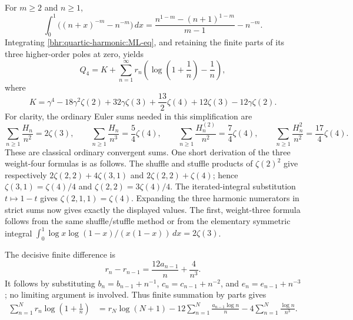 For $m\ge2$ and $n\ge1$,
\[
 \int_0^1\bigl((n+x)^{-m}-n^{-m}\bigr)\,dx
     =\frac{n^{1-m}-(n+1)^{1-m}}{m-1}-n^{-m}.
\]
Integrating \eqref{bhr:quartic-harmonic:ML-eq}, and retaining the finite
parts of its three higher-order poles at zero, yields
\begin{equation}
 Q_4=K+\sum_{n=1}^{\infty}r_n
      \left(\log\left(1+\frac1n\right)-\frac1n\right),
      \label{bhr:quartic-harmonic:K-eq}
\end{equation}
where
\begin{equation}
 K=\gamma^4-18\gamma^2\zeta(2)+32\gamma\zeta(3)
       +\frac{13}{2}\zeta(4)+12\zeta(3)-12\gamma\zeta(2).
       \label{bhr:quartic-harmonic:K}
\end{equation}
For clarity, the ordinary Euler sums needed in this simplification are
\begin{equation}
 \sum_{n\ge1}\frac{H_n}{n^2}=2\zeta(3),\qquad
 \sum_{n\ge1}\frac{H_n}{n^3}=\frac54\zeta(4),\qquad
 \sum_{n\ge1}\frac{H_n^{(2)}}{n^2}=\frac74\zeta(4),\qquad
 \sum_{n\ge1}\frac{H_n^2}{n^2}=\frac{17}4\zeta(4).
 \label{bhr:quartic-harmonic:euler}
\end{equation}
These are classical ordinary convergent sums. One short derivation of
the three weight-four formulas is as follows. The shuffle and stuffle
products of $\zeta(2)^2$ give respectively
$2\zeta(2,2)+4\zeta(3,1)$ and $2\zeta(2,2)+\zeta(4)$;
hence $\zeta(3,1)=\zeta(4)/4$ and
$\zeta(2,2)=3\zeta(4)/4$.
The iterated-integral substitution $t\mapsto1-t$ gives
$\zeta(2,1,1)=\zeta(4)$. Expanding the three harmonic numerators
in strict sums now gives exactly the displayed values. The first,
weight-three formula follows from the same shuffle/stuffle method or
from the elementary symmetric integral
$\int_0^1\log x\log(1-x)/(x(1-x))\,dx=2\zeta(3)$.

The decisive finite difference is
\begin{equation}
 r_n-r_{n-1}=\frac{12a_{n-1}}n+\frac4{n^3}.
 \label{bhr:quartic-harmonic:residue-difference}
\end{equation}
It follows by substituting
$b_n=b_{n-1}+n^{-1}$, $c_n=c_{n-1}+n^{-2}$,
and $e_n=e_{n-1}+n^{-3}$; no limiting argument is involved.
Thus finite summation by parts gives
\begin{align}
 \sum_{n=1}^N r_n\log\left(1+\frac1n\right)
 &=r_N\log(N+1)-12\sum_{n=1}^N\frac{a_{n-1}\log n}{n}
                      -4\sum_{n=1}^N\frac{\log n}{n^3}.
 \label{bhr:quartic-harmonic:SBP}
\end{align}

